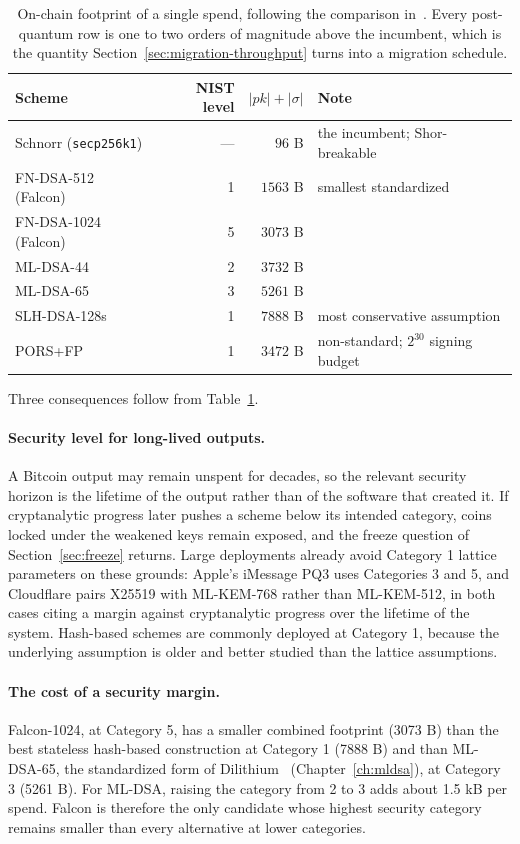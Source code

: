 \begin{table}[H]
\centering
\begin{tabular}{lrrl}
\toprule
Scheme & NIST level & $|pk| + |\sigma|$ & Note \\
\midrule
Schnorr (\texttt{secp256k1}) & --- & $96$ B & the incumbent; Shor-breakable \\
\midrule
FN-DSA-512 (Falcon)   & 1 & $1563$ B & smallest standardized \\
FN-DSA-1024 (Falcon)  & 5 & $3073$ B & \\
ML-DSA-44             & 2 & $3732$ B & \\
ML-DSA-65             & 3 & $5261$ B & \\
\midrule
SLH-DSA-128s          & 1 & $7888$ B & most conservative assumption \\
PORS+FP               & 1 & $3472$ B & non-standard; $2^{30}$ signing budget \\
\bottomrule
\end{tabular}
\caption{On-chain footprint of a single spend, following the comparison
in~\cite{blockstreamlattice2026}. Every post-quantum row is one to two orders of
magnitude above the incumbent, which is the quantity
Section~\ref{sec:migration-throughput} turns into a migration schedule.}
\label{tab:bitcoin-scheme-sizes}
\end{table}

Three consequences follow from Table~\ref{tab:bitcoin-scheme-sizes}.

\paragraph{Security level for long-lived outputs.}
A Bitcoin output may remain unspent for decades, so the relevant security
horizon is the lifetime of the output rather than of the software that created
it. If cryptanalytic progress later pushes a scheme below its intended
category, coins locked under the weakened keys remain exposed, and the freeze
question of Section~\ref{sec:freeze} returns. Large deployments already avoid
Category 1 lattice parameters on these grounds: Apple's iMessage PQ3 uses
Categories 3 and 5, and Cloudflare pairs X25519 with ML-KEM-768 rather than
ML-KEM-512, in both cases citing a margin against cryptanalytic progress over
the lifetime of the system. Hash-based schemes are commonly deployed at
Category 1, because the underlying assumption is older and better studied than
the lattice assumptions.

\paragraph{The cost of a security margin.}
Falcon-1024, at Category 5, has a smaller combined footprint (3073 B) than the
best stateless hash-based construction at Category 1 (7888 B) and than
ML-DSA-65, the standardized form of Dilithium~\cite{dilithium2018}
(Chapter~\ref{ch:mldsa}), at Category 3 (5261 B). For ML-DSA, raising the
category from 2 to 3 adds about 1.5 kB per spend. Falcon is therefore the only
candidate whose highest security category remains smaller than every
alternative at lower categories.


